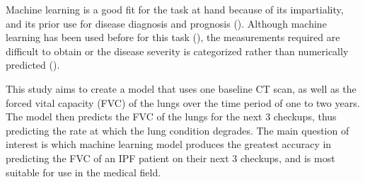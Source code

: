 \documentclass[12pt]{article}
\begin{document}
Machine learning is a good fit for the task at hand because of its impartiality, and its prior use for disease diagnosis and prognosis (\cite{wang2010high}). 
Although machine learning has been used before for this task (\cite{robbie2017evaluating,du20146,maldonado2014automated}), the measurements required are difficult to obtain or the disease severity is categorized rather than numerically predicted (\cite{walsh2018deep}).





This study aims to create a model that uses one baseline CT scan, as well as the forced vital capacity (FVC) of the lungs over the time period of one to two years.
The model then predicts the FVC of the lungs for the next 3 checkups, thus predicting the rate at which the lung condition degrades. 
The main question of interest is which machine learning model produces the greatest accuracy in predicting the FVC of an IPF patient on their next 3 checkups, and is most suitable for use in the medical field.

\end{document}
